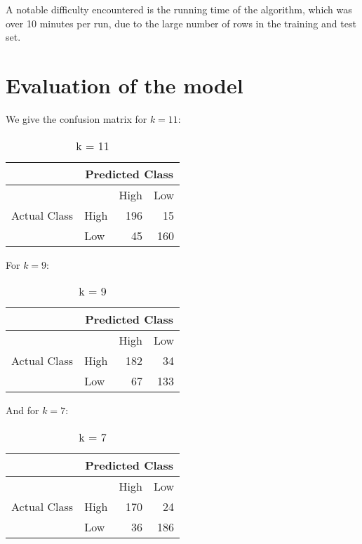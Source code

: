 \documentclass[11pt,oneside,reqno]{amsart}
\theoremstyle{plain}
\theoremstyle{definition}
\theoremstyle{remark}
\begin{document}
A notable difficulty encountered is the running time of the algorithm, which was over 10 minutes per run, due to the large number of rows in the training and test set. 

\section{Evaluation of the model}

We give the confusion matrix for $k = 11$: 

\begin{table}[H]
  \centering
  \caption{k = 11}
    \begin{tabular}{|c|l|r|r|}
    \toprule
          & \multicolumn{3}{c|}{Predicted Class} \\
    \midrule
    \multirow{3}[6]{*}{Actual Class} &       & \multicolumn{1}{l|}{High} & \multicolumn{1}{l|}{Low} \\
\cmidrule{2-4}          & High  & 196   & 15 \\
\cmidrule{2-4}          & Low   & 45    & 160 \\
    \bottomrule
    \end{tabular}%
  \label{tab:}%
\end{table}%
For $k = 9$:
\begin{table}[H]
  \centering
  \caption{k = 9}
    \begin{tabular}{|c|l|r|r|}
    \toprule
          & \multicolumn{3}{c|}{Predicted Class} \\
    \midrule
    \multirow{3}[6]{*}{Actual Class} &       & \multicolumn{1}{l|}{High} & \multicolumn{1}{l|}{Low} \\
\cmidrule{2-4}          & High  & 182   & 34 \\
\cmidrule{2-4}          & Low   & 67    & 133 \\
    \bottomrule
    \end{tabular}%
  \label{tab:addlabel}%
\end{table}%
And for $k = 7$:
\begin{table}[H]
  \centering
  \caption{k = 7}
    \begin{tabular}{|c|l|r|r|}
    \toprule
          & \multicolumn{3}{c|}{Predicted Class} \\
    \midrule
    \multirow{3}[6]{*}{Actual Class} &       & \multicolumn{1}{l|}{High} & \multicolumn{1}{l|}{Low} \\
\cmidrule{2-4}          & High  & 170   & 24 \\
\cmidrule{2-4}          & Low   & 36    & 186 \\
    \bottomrule
    \end{tabular}%
  \label{tab:addlabel}%
\end{table}%
\end{document}
